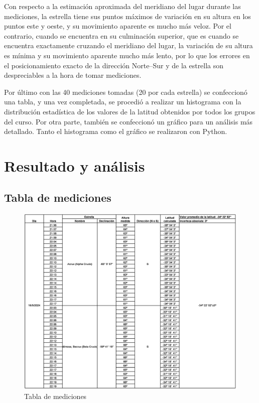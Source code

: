 \documentclass[12pt, a4paper]{article} %
\begin{document}
Con respecto a la estimación aproximada del meridiano del lugar durante las mediciones, la estrella tiene sus puntos máximos de variación en su altura en los puntos este y oeste, y su movimiento aparente es mucho más veloz. Por el contrario, cuando se encuentra en su culminación superior, que es cuando se encuentra exactamente cruzando el meridiano del lugar, la variación de su altura es mínima y su movimiento aparente mucho más lento, por lo que los errores en el  posicionamiento exacto de la dirección Norte–Sur y de la estrella son despreciables a la hora de tomar mediciones.

Por último con las 40 mediciones tomadas (20 por cada estrella) se confeccionó una tabla, y una vez completada, se procedió a realizar un histograma con la distribución estadística de los valores de la latitud obtenidos por todos los grupos del curso. Por otra parte, también se confeccionó un gráfico para un análisis más detallado. Tanto el histograma como el gráfico se realizaron con Python.


\section{Resultado y análisis}
\subsection{Tabla de mediciones}
\begin{figure}[H]
    \centering
    \includegraphics[width=15cm]{images/tabla-TP-1-Ian_Chen_y_Lola_Cavalieri .jpg}
    \caption{Tabla de mediciones}
    \label{fig:tabla-mediciones}
\end{figure}
\end{document}
